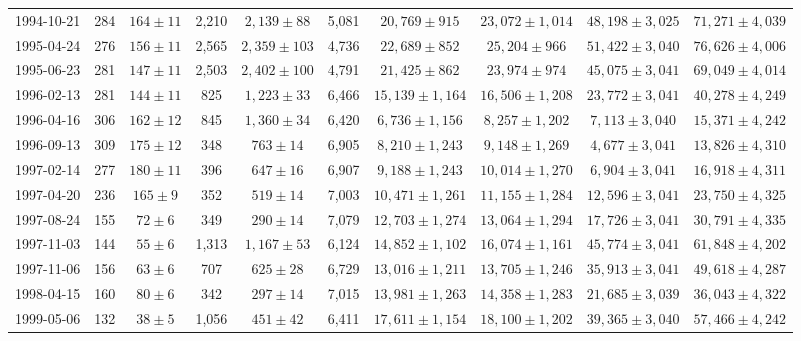 \begin{landscape}
\begin{longtable}{cccccccccc}
{1994-10-21} & 284 & {$164  \pm  11$} & 2,210 & {$2,139 \pm 88$} & 5,081 & {$20,769 \pm 915$} & {$23,072 \pm 1,014$} & {$48,198 \pm 3,025$} & {$71,271 \pm 4,039$} \\
{1995-04-24} & 276 & {$156  \pm  11$} & 2,565 & {$2,359 \pm 103$} & 4,736 & {$22,689 \pm 852$} & {$25,204 \pm 966$} & {$51,422 \pm 3,040$} & {$76,626 \pm 4,006$} \\
{1995-06-23} & 281 & {$147  \pm  11$} & 2,503 & {$2,402 \pm 100$} & 4,791 & {$21,425 \pm 862$} & {$23,974 \pm 974$} & {$45,075 \pm 3,041$} & {$69,049 \pm 4,014$} \\
{1996-02-13} & 281 & {$144  \pm  11$} & 825 & {$1,223 \pm 33$} & 6,466 & {$15,139 \pm 1,164$} & {$16,506 \pm 1,208$} & {$23,772 \pm 3,041$} & {$40,278 \pm 4,249$} \\
{1996-04-16} & 306 & {$162  \pm  12$} & 845 & {$1,360 \pm 34$} & 6,420 & {$6,736 \pm 1,156$} & {$8,257 \pm 1,202$} & {$7,113 \pm 3,040$} & {$15,371 \pm 4,242$} \\
{1996-09-13} & 309 & {$175  \pm  12$} & 348 & {$763 \pm 14$} & 6,905 & {$8,210 \pm 1,243$} & {$9,148 \pm 1,269$} & {$4,677 \pm 3,041$} & {$13,826 \pm 4,310$} \\
{1997-02-14} & 277 & {$180  \pm  11$} & 396 & {$647 \pm 16$} & 6,907 & {$9,188 \pm 1,243$} & {$10,014 \pm 1,270$} & {$6,904 \pm 3,041$} & {$16,918 \pm 4,311$} \\
{1997-04-20} & 236 & {$165  \pm  9$} & 352 & {$519 \pm 14$} & 7,003 & {$10,471 \pm 1,261$} & {$11,155 \pm 1,284$} & {$12,596 \pm 3,041$} & {$23,750 \pm 4,325$} \\
{1997-08-24} & 155 & {$72  \pm  6$} & 349 & {$290 \pm 14$} & 7,079 & {$12,703 \pm 1,274$} & {$13,064 \pm 1,294$} & {$17,726 \pm 3,041$} & {$30,791 \pm 4,335$} \\
{1997-11-03} & 144 & {$55  \pm  6$} & 1,313 & {$1,167 \pm 53$} & 6,124 & {$14,852 \pm 1,102$} & {$16,074 \pm 1,161$} & {$45,774 \pm 3,041$} & {$61,848 \pm 4,202$} \\
{1997-11-06} & 156 & {$63  \pm  6$} & 707 & {$625 \pm 28$} & 6,729 & {$13,016 \pm 1,211$} & {$13,705 \pm 1,246$} & {$35,913 \pm 3,041$} & {$49,618 \pm 4,287$} \\
{1998-04-15} & 160 & {$80  \pm  6$} & 342 & {$297 \pm 14$} & 7,015 & {$13,981 \pm 1,263$} & {$14,358 \pm 1,283$} & {$21,685 \pm 3,039$} & {$36,043 \pm 4,322$} \\
{1999-05-06} & 132 & {$38  \pm  5$} & 1,056 & {$451 \pm 42$} & 6,411 & {$17,611 \pm 1,154$} & {$18,100 \pm 1,202$} & {$39,365 \pm 3,040$} & {$57,466 \pm 4,242$} \\

\end{longtable}
\end{landscape}
